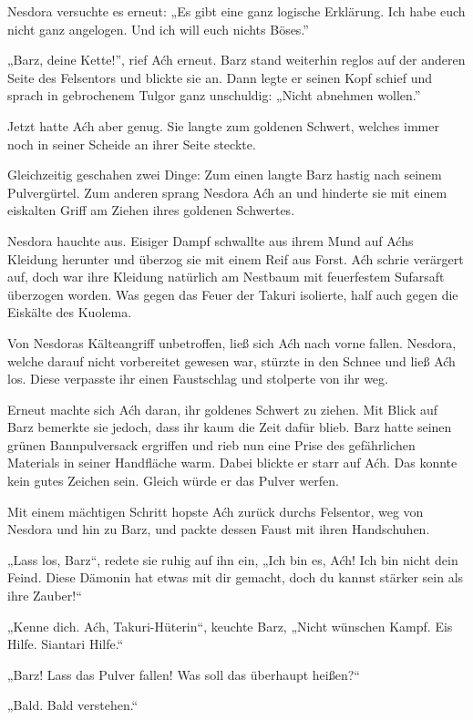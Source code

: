 Nesdora versuchte es erneut: „Es gibt eine ganz logische Erklärung. Ich habe euch nicht ganz angelogen. Und ich will euch nichts Böses.”

„Barz, deine Kette!”, rief Aćh erneut. Barz stand weiterhin reglos auf der anderen Seite des Felsentors und blickte sie an. Dann legte er seinen Kopf schief und sprach in gebrochenem Tulgor ganz unschuldig: „Nicht abnehmen wollen.”

Jetzt hatte Aćh aber genug. Sie langte zum goldenen Schwert, welches immer noch in seiner Scheide an ihrer Seite steckte.

Gleichzeitig geschahen zwei Dinge: Zum einen langte Barz hastig nach seinem Pulvergürtel. Zum anderen sprang Nesdora Aćh an und hinderte sie mit einem eiskalten Griff am Ziehen ihres goldenen Schwertes.

Nesdora hauchte aus. Eisiger Dampf schwallte aus ihrem Mund auf Aćhs Kleidung herunter und überzog sie mit einem Reif aus Forst. Aćh schrie verärgert auf, doch war ihre Kleidung natürlich am Nestbaum mit feuerfestem Sufarsaft überzogen worden. Was gegen das Feuer der Takuri isolierte, half auch gegen die Eiskälte des Kuolema.

Von Nesdoras Kälteangriff unbetroffen, ließ sich Aćh nach vorne fallen. Nesdora, welche darauf nicht vorbereitet gewesen war, stürzte in den Schnee und ließ Aćh los. Diese verpasste ihr einen Faustschlag und stolperte von ihr weg.

Erneut machte sich Aćh daran, ihr goldenes Schwert zu ziehen. Mit Blick auf Barz bemerkte sie jedoch, dass ihr kaum die Zeit dafür blieb. Barz hatte seinen grünen Bannpulversack ergriffen und rieb nun eine Prise des gefährlichen Materials in seiner Handfläche warm. Dabei blickte er starr auf Aćh. Das konnte kein gutes Zeichen sein. Gleich würde er das Pulver werfen.

Mit einem mächtigen Schritt hopste Aćh zurück durchs Felsentor, weg von Nesdora und hin zu Barz, und packte dessen Faust mit ihren Handschuhen.

„Lass los, Barz“, redete sie ruhig auf ihn ein, „Ich bin es, Aćh! Ich bin nicht dein Feind. Diese Dämonin hat etwas mit dir gemacht, doch du kannst stärker sein als ihre Zauber!“

„Kenne dich. Aćh, Takuri-Hüterin“, keuchte Barz, „Nicht wünschen Kampf. Eis Hilfe. Siantari Hilfe.“

„Barz! Lass das Pulver fallen! Was soll das überhaupt heißen?“

„Bald. Bald verstehen.“

